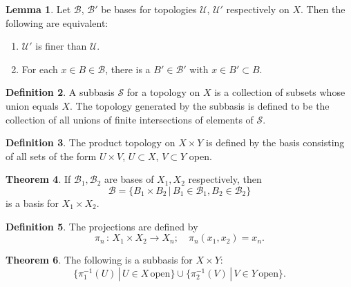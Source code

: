 \documentclass[twocolumn]{article}
\theoremstyle{definition}
\newtheorem{definition}{Definition}[section]
\newtheorem{theorem}[definition]{Theorem}
\newtheorem{lemma}[definition]{Lemma}
\begin{document}
\begin{lemma}
    Let $\mathcal{B}$, $\mathcal{B}'$ be bases for topologies $\mathcal{U}$, $\mathcal{U}'$ respectively on $X$. Then the following are equivalent:
    \begin{enumerate}[noitemsep]
            \item $\mathcal{U}'$ is finer than $\mathcal{U}$.
            \item For each $x \in B \in \mathcal{B}$, there is a $B' \in \mathcal{B'}$ with $x \in B' \subset B$.
    \end{enumerate}
\end{lemma}
\begin{definition}
    A subbasis $\mathcal{S}$ for a topology on $X$ is a collection of subsets whose union equals $X$.
    The topology generated by the subbasis is defined to be the collection of all unions of finite intersections of elements of $\mathcal{S}$.
\end{definition}
\begin{definition}
    The product topology on $X \times Y$ is defined by the basis consisting of all sets of the form $U \times V$, $U \subset X$, $V \subset Y$ open.
\end{definition}
\begin{theorem}
    If $\mathcal{B}_1, \mathcal{B}_2$ are bases of $X_1, X_2$ respectively, then
    \begin{equation}
        \mathcal{B} = \{B_1 \times B_2 \, | \, B_1 \in \mathcal{B}_1, B_2 \in \mathcal{B}_2\}
    \end{equation}
    is a basis for $X_1 \times X_2$.
\end{theorem}
\begin{definition}
    The projections are defined by
    \begin{equation}
        \pi_n \, : \, X_1 \times X_2 \rightarrow X_n; \quad \pi_n(x_1, x_2) = x_n.
    \end{equation}
\end{definition}
\begin{theorem}
    The following is a subbasis for $X \times Y$:
    \begin{equation}
        \{ \pi_1^{-1}(U) \, | \, U \in X \,\textrm{open} \}
        \cup \{ \pi_2^{-1}(V) \, | \, V \in Y \,\textrm{open} \}.
    \end{equation}
\end{theorem}
\end{document}
